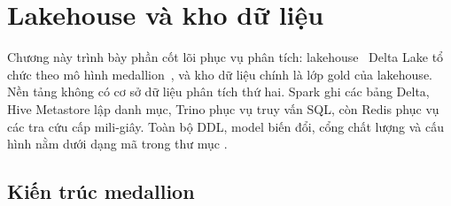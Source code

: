 \chapter{Lakehouse và kho dữ liệu}
\label{chap:lakehouse}

Chương này trình bày phần cốt lõi phục vụ phân tích: lakehouse~\cite{armbrust2021lakehouse} Delta Lake tổ chức theo mô hình medallion~\cite{databricksMedallion}, và kho dữ liệu chính là lớp gold của lakehouse. Nền tảng không có cơ sở dữ liệu phân tích thứ hai. Spark ghi các bảng Delta, Hive Metastore lập danh mục, Trino phục vụ truy vấn SQL, còn Redis phục vụ các tra cứu cấp mili-giây. Toàn bộ DDL, model biến đổi, cổng chất lượng và cấu hình nằm dưới dạng mã trong thư mục .

\section{Kiến trúc medallion}


